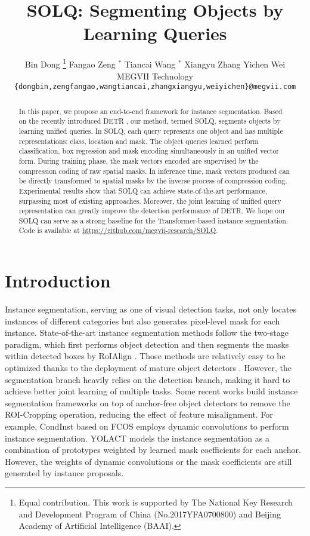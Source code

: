 \documentclass{article}
\title{SOLQ: Segmenting Objects by Learning Queries}
\author{Bin Dong \thanks{Equal contribution. This work is supported by The National Key Research and Development Program of China (No.2017YFA0700800) and Beijing Academy of Artificial Intelligence (BAAI).} \qquad Fangao Zeng $^{*}$ \qquad Tiancai Wang $^{*}$ \qquad Xiangyu Zhang \qquad Yichen Wei \\
  MEGVII Technology\\
  \texttt{{\tt\small {\{dongbin,zengfangao,wangtiancai,zhangxiangyu,weiyichen\}}@megvii.com}} \\
}
\begin{document}
\maketitle

\begin{abstract}
In this paper, we propose an end-to-end framework for instance segmentation. Based on the recently introduced DETR \cite{carion2020detr}, our method, termed SOLQ, segments objects by learning unified queries. In SOLQ, each query represents one object and has multiple representations: class, location and mask. The object queries learned perform classification, box regression and mask encoding simultaneously in an unified vector form. During training phase, the mask vectors encoded are supervised by the compression coding of raw spatial masks. In inference time, mask vectors produced can be directly transformed to spatial masks by the inverse process of compression coding. Experimental results show that SOLQ can achieve state-of-the-art performance, surpassing most of existing approaches. Moreover, the joint learning of unified query representation can greatly improve the detection performance of DETR. We hope our SOLQ can serve as a strong baseline for the Transformer-based instance segmentation. Code is available at \url{https://github.com/megvii-research/SOLQ}.
\end{abstract}

\section{Introduction}
Instance segmentation, serving as one of visual detection tasks, not only locates instances of different categories but also generates pixel-level mask for each instance. State-of-the-art instance segmentation methods \cite{he2017maskrcnn, huang2019maskscoringrcnn, chen2019hybrid, liu2018panet} follow the two-stage paradigm, which first performs object detection and then segments the masks within detected boxes by RoIAlign \cite{he2017maskrcnn}. Those methods are relatively easy to be optimized thanks to the deployment of mature object detectors \cite{ren2015faster, cai2018cascade}. However, the segmentation branch heavily relies on the detection branch, making it hard to achieve better joint learning of multiple tasks. 
Some recent works \cite{bolya2019yolact, tian2020conditional, lee2020centermask, peng2020deepsnake} build instance segmentation frameworks on top of anchor-free object detectors \cite{tian2019fcos, duan2019centernet} to remove the ROI-Cropping operation, reducing the effect of feature misalignment. For example, CondInst \cite{tian2020conditional} based on FCOS \cite{tian2019fcos} employs dynamic convolutions \cite{jia2016dynamicconv} to perform instance segmentation. YOLACT \cite{bolya2019yolact} models the instance segmentation as a combination of prototypes weighted by learned mask coefficients for each anchor. However, the weights of dynamic convolutions or the mask coefficients are still generated by instance proposals. 
\end{document}
